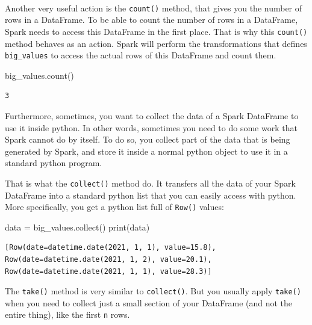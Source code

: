 \documentclass[
  11pt,
  letterpaper,
  DIV=11,
  numbers=noendperiod]{scrreprt}
\newenvironment{Shaded}{\begin{snugshade}}{\end{snugshade}}
\newcommand{\BuiltInTok}[1]{\textcolor[rgb]{0.00,0.23,0.31}{#1}}
\newcommand{\NormalTok}[1]{\textcolor[rgb]{0.00,0.23,0.31}{#1}}
\newcommand{\OperatorTok}[1]{\textcolor[rgb]{0.37,0.37,0.37}{#1}}
\begin{document}
\begin{verbatim}
                                                                                
\end{verbatim}

Another very useful action is the \texttt{count()} method, that gives
you the number of rows in a DataFrame. To be able to count the number of
rows in a DataFrame, Spark needs to access this DataFrame in the first
place. That is why this \texttt{count()} method behaves as an action.
Spark will perform the transformations that defines \texttt{big\_values}
to access the actual rows of this DataFrame and count them.

\begin{Shaded}
\begin{Highlighting}[]
\NormalTok{big\_values.count()}
\end{Highlighting}
\end{Shaded}

\begin{verbatim}
3
\end{verbatim}

Furthermore, sometimes, you want to collect the data of a Spark
DataFrame to use it inside python. In other words, sometimes you need to
do some work that Spark cannot do by itself. To do so, you collect part
of the data that is being generated by Spark, and store it inside a
normal python object to use it in a standard python program.

That is what the \texttt{collect()} method do. It transfers all the data
of your Spark DataFrame into a standard python list that you can easily
access with python. More specifically, you get a python list full of
\texttt{Row()} values:

\begin{Shaded}
\begin{Highlighting}[]
\NormalTok{data }\OperatorTok{=}\NormalTok{ big\_values.collect()}
\BuiltInTok{print}\NormalTok{(data)}
\end{Highlighting}
\end{Shaded}

\begin{verbatim}
[Row(date=datetime.date(2021, 1, 1), value=15.8), Row(date=datetime.date(2021, 1, 2), value=20.1), Row(date=datetime.date(2021, 1, 1), value=28.3)]
\end{verbatim}

The \texttt{take()} method is very similar to \texttt{collect()}. But
you usually apply \texttt{take()} when you need to collect just a small
section of your DataFrame (and not the entire thing), like the first
\texttt{n} rows.
\end{document}
